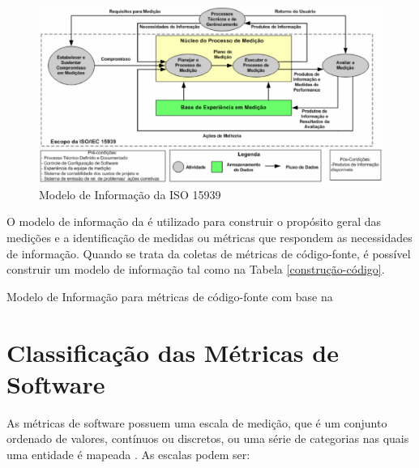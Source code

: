 \begin{figure}[h!]
\centering
	\includegraphics[keepaspectratio=true,scale=0.3]{figuras/processo15939.eps}
	\caption{Modelo de Informação da ISO 15939}
	\label{informação}
\end{figure}
\FloatBarrier

O modelo de informação da  é utilizado para construir o 
propósito geral das medições e a identificação de medidas ou métricas que respondem as necessidades de informação. Quando se trata da coletas de métricas de código-fonte, é possível construir um modelo de informação tal como na Tabela \ref{construção-código}.

	\begin{table}[!ht]
	\begin{center}
	
	 
	\caption{Modelo de Informação para métricas de código-fonte com base na 
	}
	\label{construção-código}
	\end{center}
	\end{table}		


\section{Classificação das Métricas de Software}	
\label{Classificação das Métricas de Software}

As métricas de software possuem uma escala de medição, que é um conjunto 
ordenado de valores, contínuos ou discretos, ou uma série de categorias nas 
quais uma entidade é mapeada \cite{ISO:15939}. As escalas podem ser:

